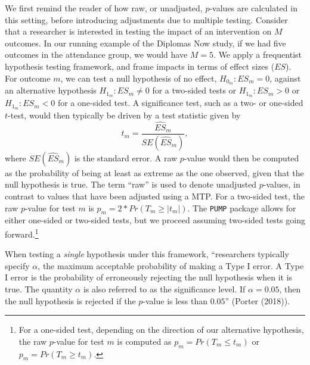 \documentclass[
]{article}
\begin{document}
We first remind the reader of how raw, or unadjusted, \(p\)-values are
calculated in this setting, before introducing adjustments due to
multiple testing. Consider that a researcher is interested in testing
the impact of an intervention on \(M\) outcomes. In our running example
of the Diplomas Now study, if we had five outcomes in the attendance
group, we would have \(M = 5\). We apply a frequentist hypothesis
testing framework, and frame impacts in terms of effect sizes (\(ES\)).
For outcome \(m\), we can test a null hypothesis of no effect,
\(H_{0_m}: ES_m = 0\), against an alternative hypothesis
\(H_{1_m}: ES_m \neq 0\) for a two-sided tests or \(H_{1_m}: ES_m > 0\)
or \(H_{1_m}: ES_m < 0\) for a one-sided test. A significance test, such
as a two- or one-sided \(t\)-test, would then typically be driven by a
test statistic given by \begin{equation}
t_m = \frac{\widehat{ES}_m}{SE(\hat{ES}_m)},
\end{equation} where \(SE(\hat{ES}_m)\) is the standard error. A raw
\(p\)-value would then be computed as the probability of being at least
as extreme as the one observed, given that the null hypothesis is true.
The term ``raw'' is used to denote unadjusted \(p\)-values, in contrast
to values that have been adjusted using a MTP. For a two-sided test, the
raw \(p\)-value for test \(m\) is \(p_m=2*Pr(T_m \geq |t_m|)\). The
\texttt{PUMP} package allows for either one-sided or two-sided tests,
but we proceed assuming two-sided tests going
forward.\footnote{For a one-sided test, depending on the direction of our alternative hypothesis, the raw $p$-value for test $m$ is computed as $p_m=Pr(T_m \leq t_m)$ or $p_m=Pr(T_m \geq t_m)$.}

When testing a \emph{single} hypothesis under this framework,
``researchers typically specify \(\alpha\), the maximum acceptable
probability of making a Type I error. A Type I error is the probability
of erroneously rejecting the null hypothesis when it is true. The
quantity \(\alpha\) is also referred to as the significance level. If
\(\alpha=0.05\), then the null hypothesis is rejected if the \(p\)-value
is less than \(0.05\)'' (Porter (2018)).
\end{document}
